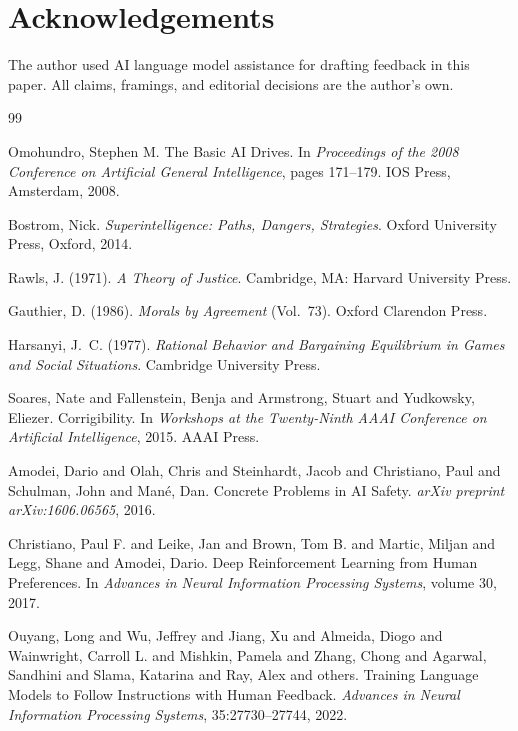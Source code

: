\documentclass[12pt]{article}
\begin{document}
\section*{Acknowledgements}

The author used AI language model assistance for drafting feedback in this paper. All claims, framings, and editorial decisions are the author's own.

\begin{thebibliography}{99}

Omohundro, Stephen M.
The Basic {AI} Drives.
In \textit{Proceedings of the 2008 Conference on Artificial General Intelligence},
pages 171--179. IOS Press, Amsterdam, 2008.

Bostrom, Nick.
\textit{Superintelligence: Paths, Dangers, Strategies}.
Oxford University Press, Oxford, 2014.

Rawls, J. (1971). \emph{A Theory of Justice}. Cambridge, MA: Harvard University Press.

Gauthier, D. (1986). \emph{Morals by Agreement} (Vol.~73). Oxford Clarendon Press.

Harsanyi, J.~C. (1977). \emph{Rational Behavior and Bargaining Equilibrium in Games and Social Situations}. Cambridge University Press.

Soares, Nate and Fallenstein, Benja and Armstrong, Stuart and Yudkowsky, Eliezer.
Corrigibility.
In \textit{Workshops at the Twenty-Ninth {AAAI} Conference on Artificial Intelligence},
2015. AAAI Press.

Amodei, Dario and Olah, Chris and Steinhardt, Jacob and Christiano, Paul and Schulman, John and Man{\'e}, Dan.
Concrete Problems in {AI} Safety.
\textit{arXiv preprint arXiv:1606.06565}, 2016.

Christiano, Paul F. and Leike, Jan and Brown, Tom B. and Martic, Miljan and Legg, Shane and Amodei, Dario.
Deep Reinforcement Learning from Human Preferences.
In \textit{Advances in Neural Information Processing Systems}, volume 30, 2017.

Ouyang, Long and Wu, Jeffrey and Jiang, Xu and Almeida, Diogo and Wainwright, Carroll L. and Mishkin, Pamela and Zhang, Chong and Agarwal, Sandhini and Slama, Katarina and Ray, Alex and others.
Training Language Models to Follow Instructions with Human Feedback.
\textit{Advances in Neural Information Processing Systems}, 35:27730--27744, 2022.


\end{thebibliography}
\end{document}
